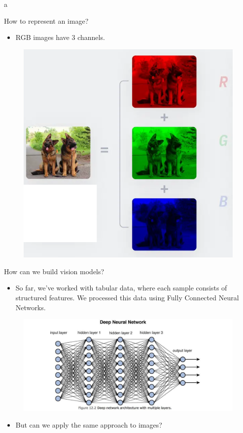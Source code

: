 a\documentclass[10pt]{beamer}
\theoremstyle{remark}
\theoremstyle{definition}
\begin{document}
\begin{frame}{How to represent an image?}
\begin{itemize}

    \item RGB images have 3 channels.
\end{itemize}
\begin{figure}
\centering
\includegraphics[width=1.5\textwidth,height=0.7\textheight,keepaspectratio]{./images/RGB.png}
\end{figure}
\end{frame}

\begin{frame}{How can we build vision models?}
\begin{itemize}
    \item So far, we’ve worked with tabular data, where each sample consists of structured features. We processed this data using Fully Connected Neural Networks.

\end{itemize}
\begin{figure}
\centering
\includegraphics[width=1.0\textwidth,height=1.0\textheight,keepaspectratio]{./images/nn.jpg}
\end{figure}
\begin{itemize}
    \item But can we apply the same approach to images?
\end{itemize}

\end{frame}
\end{document}
